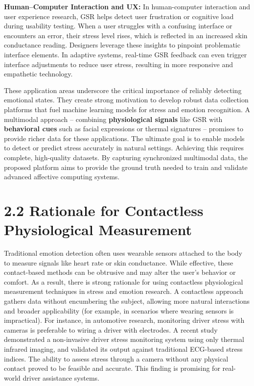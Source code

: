 \textbf{Human–Computer Interaction and UX:} In human-computer interaction and user experience research, GSR helps detect user frustration or cognitive load during usability testing. When a user struggles with a confusing interface or encounters an error, their stress level rises, which is reflected in an increased skin conductance reading\cite{Picard2001}. Designers leverage these insights to pinpoint problematic interface elements. In adaptive systems, real-time GSR feedback can even trigger interface adjustments to reduce user stress, resulting in more responsive and empathetic technology.

These application areas underscore the critical importance of reliably detecting emotional states. They create strong motivation to develop robust data collection platforms that fuel machine learning models for stress and emotion recognition. A multimodal approach – combining \textbf{physiological signals} like GSR with \textbf{behavioral cues} such as facial expressions or thermal signatures – promises to provide richer data for these applications. The ultimate goal is to enable models to detect or predict stress accurately in natural settings. Achieving this requires complete, high-quality datasets. By capturing synchronized multimodal data, the proposed platform aims to provide the ground truth needed to train and validate advanced affective computing systems.

\section{2.2 Rationale for Contactless Physiological Measurement}

Traditional emotion detection often uses wearable sensors attached to the body to measure signals like heart rate or skin conductance. While effective, these contact-based methods can be obtrusive and may alter the user's behavior or comfort. As a result, there is strong rationale for using contactless physiological measurement techniques in stress and emotion research. A contactless approach gathers data without encumbering the subject, allowing more natural interactions and broader applicability (for example, in scenarios where wearing sensors is impractical). For instance, in automotive research, monitoring driver stress with cameras is preferable to wiring a driver with electrodes. A recent study demonstrated a non-invasive driver stress monitoring system using only thermal infrared imaging, and validated its output against traditional ECG-based stress indices\cite{DriverStressThermal2020}. The ability to assess stress through a camera without any physical contact proved to be feasible and accurate. This finding is promising for real-world driver assistance systems.

